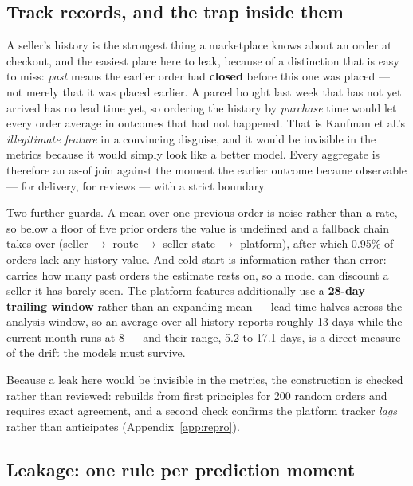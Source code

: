 \subsection{Track records, and the trap inside them}
\label{sec:history}

A seller's history is the strongest thing a marketplace knows about an order at
checkout, and the easiest place here to leak, because of a distinction that is
easy to miss: \emph{past} means the earlier order had \textbf{closed} before this
one was placed --- not merely that it was placed earlier. A parcel bought last
week that has not yet arrived has no lead time yet, so ordering the history by
\emph{purchase} time would let every order average in outcomes that had not
happened. That is Kaufman et al.'s \emph{illegitimate feature}
\citep{kaufman2012leakage} in a convincing disguise, and it would be invisible in
the metrics because it would simply look like a better model. Every aggregate is
therefore an as-of join against the moment the earlier outcome became observable
---  for delivery,
 for reviews --- with a strict boundary.

Two further guards. A mean over one previous order is noise rather than a rate,
so below a floor of five prior orders the value is undefined and a fallback chain
takes over (seller $\rightarrow$ route $\rightarrow$ seller state $\rightarrow$
platform), after which 0.95\% of orders lack any history value. And cold start is
information rather than error:  carries how many past
orders the estimate rests on, so a model can discount a seller it has barely
seen. The platform features additionally use a \textbf{28-day trailing window}
rather than an expanding mean --- lead time halves across the analysis window, so
an average over all history reports roughly 13 days while the current month runs
at 8 --- and their range, 5.2 to 17.1 days, is a direct measure of the drift the
models must survive.

Because a leak here would be invisible in the metrics, the construction is
checked rather than reviewed:  rebuilds
 from first principles for 200 random orders and
requires exact agreement, and a second check confirms the platform tracker
\emph{lags} rather than anticipates (Appendix~\ref{app:repro}).

\subsection{Leakage: one rule per prediction moment}

